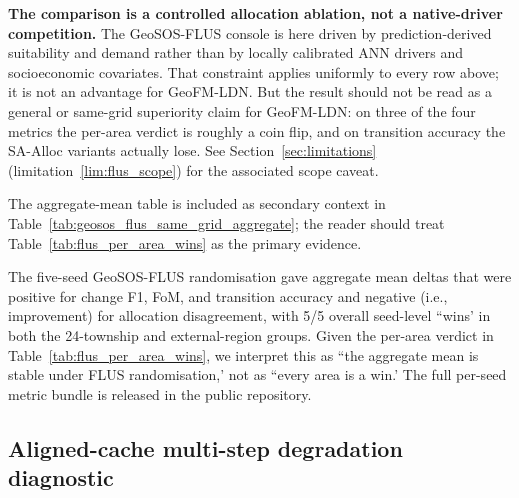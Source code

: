 \documentclass{article}
\begin{document}
\textbf{The comparison is a controlled allocation ablation, not a native-driver competition.} The GeoSOS-FLUS console is here driven by prediction-derived suitability and demand rather than by locally calibrated ANN drivers and socioeconomic covariates. That constraint applies uniformly to every row above; it is not an advantage for GeoFM-LDN. But the result should not be read as a general or same-grid superiority claim for GeoFM-LDN: on three of the four metrics the per-area verdict is roughly a coin flip, and on transition accuracy the SA-Alloc variants actually lose. See Section~\ref{sec:limitations} (limitation~\ref{lim:flus_scope}) for the associated scope caveat.

The aggregate-mean table is included as secondary context in Table~\ref{tab:geosos_flus_same_grid_aggregate}; the reader should treat Table~\ref{tab:flus_per_area_wins} as the primary evidence.

\begin{table}[htbp]
\centering
\caption{Aggregate-mean same-grid comparison (secondary context only; the per-area paired-inference table above is the primary evidence). Township valid-pixel counts range from 3{,}176 to 37{,}126, so pixel-weighted aggregate means differ from unweighted per-area means.}
\label{tab:geosos_flus_same_grid_aggregate}
\scriptsize
{}
\end{table}

The five-seed GeoSOS-FLUS randomisation gave aggregate mean deltas that were positive for change F1, FoM, and transition accuracy and negative (i.e., improvement) for allocation disagreement, with 5/5 overall seed-level ``wins' in both the 24-township and external-region groups. Given the per-area verdict in Table~\ref{tab:flus_per_area_wins}, we interpret this as ``the aggregate mean is stable under FLUS randomisation,' not as ``every area is a win.' The full per-seed metric bundle is released in the public repository.

\subsection{Aligned-cache multi-step degradation diagnostic}
\end{document}

